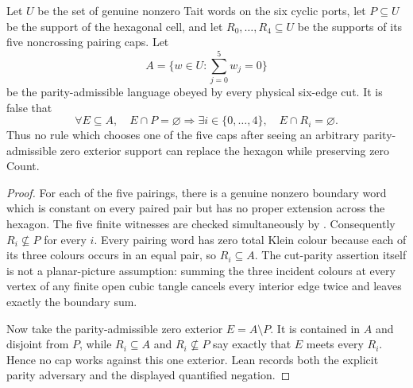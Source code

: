 \begin{proposition}
\label{prop:hexagon-target-aware-pairing-obstruction}
Let \(U\) be the set of genuine nonzero Tait words on the six cyclic ports,
let \(P\subseteq U\) be the support of the hexagonal cell, and let
\(R_0,\ldots,R_4\subseteq U\) be the supports of its five noncrossing pairing
caps.  Let
\[
                  A=\{w\in U:\textstyle\sum_{j=0}^{5}w_j=0\}
\]
be the parity-admissible language obeyed by every physical six-edge cut.  It
is false that
\[
  \forall E\subseteq A,\quad E\cap P=\varnothing
  \Longrightarrow
  \exists i\in\{0,\ldots,4\},\quad E\cap R_i=\varnothing.
\]
Thus no rule which chooses one of the five caps after seeing an arbitrary
parity-admissible zero exterior support can replace the hexagon while
preserving zero Count.
\end{proposition}

\begin{proof}
For each of the five pairings, there is a genuine nonzero boundary word which
is constant on every paired pair but has no proper extension across the
hexagon.  The five finite witnesses are checked simultaneously by
.
Consequently \(R_i\nsubseteq P\) for every \(i\).  Every pairing word has
zero total Klein colour because each of its three colours occurs in an equal
pair, so \(R_i\subseteq A\).
The cut-parity assertion itself is not a planar-picture assumption: summing
the three incident colours at every vertex of any finite open cubic tangle
cancels every interior edge twice and leaves exactly the boundary sum.

Now take the parity-admissible zero exterior \(E=A\setminus P\).  It is
contained in \(A\) and disjoint from \(P\), while
\(R_i\subseteq A\) and \(R_i\nsubseteq P\) say exactly that \(E\) meets every
\(R_i\).  Hence no cap works against this one exterior.  Lean records both
the explicit parity adversary and the displayed quantified negation.
\end{proof}

